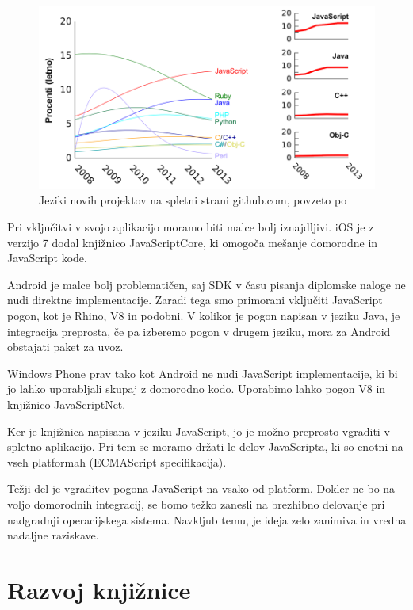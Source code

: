 \begin{figure}
 \includegraphics[width=\linewidth]{github-jeziki}
 \caption{Jeziki novih projektov na spletni strani github.com, povzeto po \cite{redmonk}}
 \label{fig:github-jeziki}
\end{figure}

Pri vključitvi v svojo aplikacijo moramo biti malce bolj iznajdljivi. iOS je z verzijo 7 dodal knjižnico JavaScriptCore, ki omogoča mešanje domorodne in JavaScript kode.

Android je malce bolj problematičen, saj SDK v času pisanja diplomske naloge ne nudi direktne implementacije. Zaradi tega smo primorani vključiti JavaScript pogon, kot je Rhino, V8 in podobni. V kolikor je pogon napisan v jeziku Java, je integracija preprosta, če pa izberemo pogon v drugem jeziku, mora za Android obstajati paket za uvoz.

Windows Phone prav tako kot Android ne nudi JavaScript implementacije, ki bi jo lahko uporabljali skupaj z domorodno kodo. Uporabimo lahko pogon V8 in knjižnico JavaScriptNet\cite{javascriptdotnet}.

Ker je knjižnica napisana v jeziku JavaScript, jo je možno preprosto vgraditi v spletno aplikacijo. Pri tem se moramo držati le delov JavaScripta, ki so enotni na vseh platformah (ECMAScript specifikacija).

Težji del je vgraditev pogona JavaScript na vsako od platform. Dokler ne bo na voljo domorodnih integracij, se bomo težko zanesli na brezhibno delovanje pri nadgradnji operacijskega sistema. Navkljub temu, je ideja zelo zanimiva in vredna nadaljne raziskave.

\chapter{Razvoj knjižnice}
\label{chap:development}

